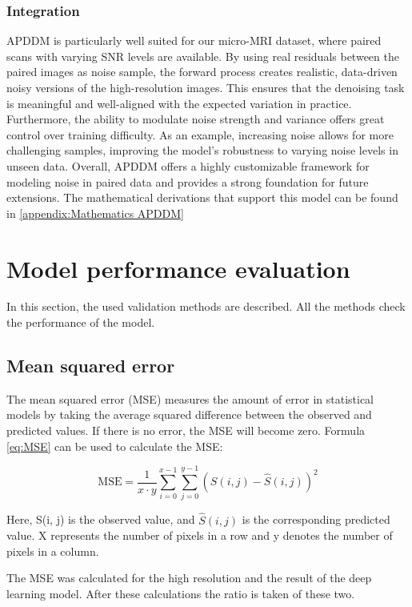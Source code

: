 \documentclass[twocolumn]{article}
\begin{document}
\subsubsection{Integration}
APDDM is particularly well suited for our micro-MRI dataset, where paired scans with varying SNR levels are available. 
By using real residuals between the paired images as noise sample, the forward process creates realistic, data-driven noisy versions of the high-resolution images. 
This ensures that the denoising task is meaningful and well-aligned with the expected variation in practice. 
Furthermore, the ability to modulate noise strength and variance offers great control over training difficulty. 
As an example, increasing noise allows for more challenging samples, improving the model's robustness to varying noise levels in unseen data. 
Overall, APDDM offers a highly customizable framework for modeling noise in paired data and provides a strong foundation for future extensions. 
The mathematical derivations that support this model can be found in \ref{appendix:Mathematics APDDM}


\section{Model performance evaluation}
In this section, the used validation methods are described. All the methods check the performance of the model. 

\subsection{Mean squared error}
The mean squared error (MSE) measures the amount of error in statistical models by taking the average squared difference between the observed and predicted values. 
If there is no error, the MSE will become zero. Formula \ref{eq:MSE} can be used to calculate the MSE: 

\begin{equation}\label{eq:MSE}
    \text{MSE} = \frac{1}{x \cdot y} \sum_{i=0}^{x-1} \sum_{j=0}^{y-1} \left( S(i, j) - \hat{S}(i, j) \right)^2
\end{equation}

Here, S(i, j) is the observed value, and $\hat{S}(i, j)$  is the corresponding predicted value. 
X represents the number of pixels in a row and y denotes the number of pixels in a column. \cite{mseJim}

The MSE was calculated for the high resolution and the result of the deep learning model. After these calculations the ratio is taken of these two.
\end{document}
